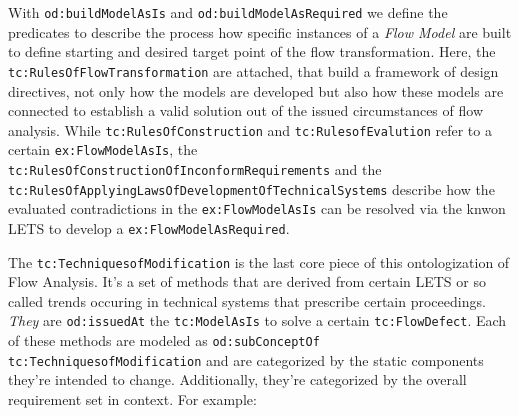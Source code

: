 \documentclass[a4paper,11pt]{article}
\begin{document}
\begin{itemize}
    With \texttt{od:buildModelAsIs} and \texttt{od:buildModelAsRequired} we define the
    predicates to describe the process how specific instances of a \emph{Flow Model}
    are built to define starting and desired target point of the flow transformation.
    Here, the \texttt{tc:RulesOfFlowTransformation} are attached, that build a
    framework of design directives, not only how the models are developed but also
    how these models are connected to establish a valid solution out of the issued
    circumstances of flow analysis. While \texttt{tc:RulesOfConstruction} and
    \texttt{tc:RulesofEvalution} refer to a certain \texttt{ex:FlowModelAsIs}, 
    the \texttt{tc:RulesOfConstructionOfInconformRequirements} and the
    \texttt{tc:RulesOfApplyingLawsOfDevelopmentOfTechnicalSystems} describe
    how the evaluated contradictions in the \texttt{ex:FlowModelAsIs} can
    be resolved via the knwon LETS to develop a \texttt{ex:FlowModelAsRequired}.
    
    The \texttt{tc:TechniquesofModification} is the last core piece of this 
    ontologization of Flow Analysis. It's a set of methods that are derived 
    from certain LETS or so called trends occuring in technical systems 
    that prescribe certain proceedings. \cite{KoltzeSouchkov2017} \emph{They} 
    are \texttt{od:issuedAt} the \texttt{tc:ModelAsIs} to solve a certain
    \texttt{tc:FlowDefect}. Each of these methods are modeled as
    \texttt{od:subConceptOf tc:TechniquesofModification} and are categorized
    by the static components they're intended to change. Additionally,
    they're categorized by the overall requirement set in context. For example:


\end{itemize}
\end{document}
